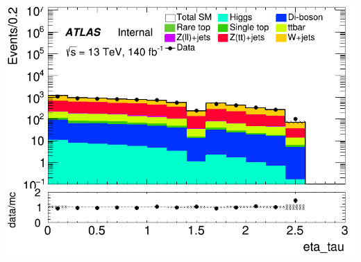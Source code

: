 \documentclass[usenames,dvipsnames]{beamer}
\begin{document}
\begin{frame}
\begin{minipage}{0.32\textwidth}
        \centering
        \includegraphics[width=\textwidth]{graphics/HH_met/HH_met_eta_tau.png}
    \end{minipage}
\end{frame}
\end{document}
